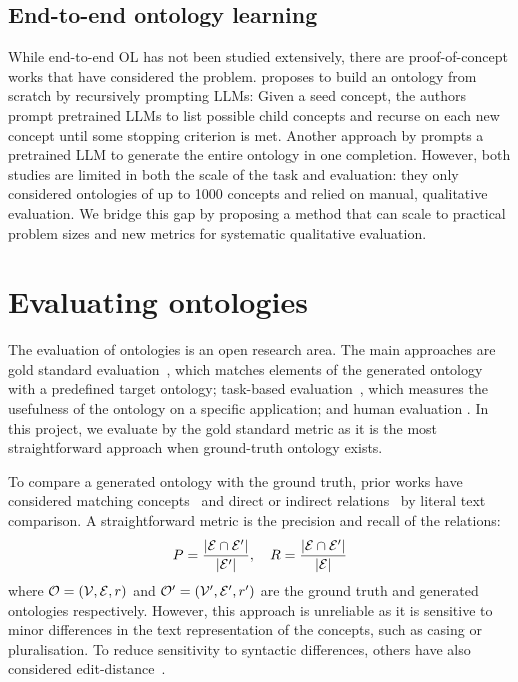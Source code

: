 \subsection{End-to-end ontology learning}

While end-to-end OL has not been studied extensively, there are proof-of-concept works that have considered the problem. \citet{funk2023towards} proposes to build an ontology from scratch by recursively prompting LLMs: Given a seed concept, the authors prompt pretrained LLMs to list possible child concepts and recurse on each new concept until some stopping criterion is met. Another approach by \citet{trajanoska2023enhancing} prompts a pretrained LLM to generate the entire ontology in one completion. However, both studies are limited in both the scale of the task and evaluation: they only considered ontologies of up to 1000 concepts and relied on manual, qualitative evaluation. We bridge this gap by proposing a method that can scale to practical problem sizes and new metrics for systematic qualitative evaluation.

\section{Evaluating ontologies}  \label{sec:evaluating-ontologies}

The evaluation of ontologies is an open research area. The main approaches are gold standard evaluation~\cite{Zavitsanos2011GoldSE}, which matches elements of the generated ontology with a predefined target ontology; task-based evaluation~\cite{porzel2004task}, which measures the usefulness of the ontology on a specific application; and human evaluation \cite{raad2015survey,brank2005survey}. In this project, we evaluate by the gold standard metric as it is the most straightforward approach when ground-truth ontology exists.

To compare a generated ontology with the ground truth, prior works have considered matching concepts~\cite{maedche2002measuring} and direct or indirect relations~\cite{Kashyap2005TaxaMinerAE} by literal text comparison. A straightforward metric is the precision and recall of the relations:
\[
    P = \frac{|\mathcal{E} \cap \mathcal{E}'|}{|\mathcal{E}'|}, \quad R = \frac{|\mathcal{E} \cap \mathcal{E}'|}{|\mathcal{E}|}
\]
where $\mathcal{O} = (\mathcal{V}, \mathcal{E}, r)$ and $\mathcal{O}' = (\mathcal{V}', \mathcal{E}', r')$ are the ground truth and generated ontologies respectively. However, this approach is unreliable as it is sensitive to minor differences in the text representation of the concepts, such as casing or pluralisation. To reduce sensitivity to syntactic differences, others have also considered edit-distance~\cite{Ehrig2005SimilarityFO}.

